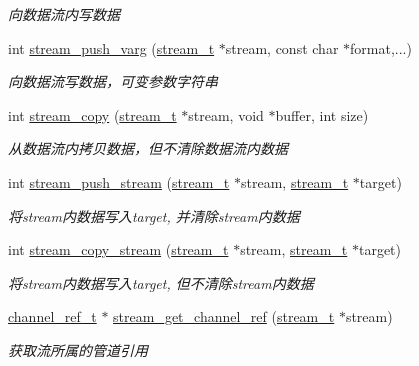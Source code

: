 \begin{DoxyCompactItemize}
\begin{DoxyCompactList}\small\item\em 向数据流内写数据 \end{DoxyCompactList}\item 
int \hyperlink{a00108_ga9631c1d90e0fad04b6ad04ccc5b95808_ga9631c1d90e0fad04b6ad04ccc5b95808}{stream\+\_\+push\+\_\+varg} (\hyperlink{a00051_a261dba04f46f5c59a68a05f69f5a65a8_a261dba04f46f5c59a68a05f69f5a65a8}{stream\+\_\+t} $\ast$stream, const char $\ast$format,...)
\begin{DoxyCompactList}\small\item\em 向数据流写数据，可变参数字符串 \end{DoxyCompactList}\item 
int \hyperlink{a00108_ga380555bf71ee99f6b2bb4f76738d507f_ga380555bf71ee99f6b2bb4f76738d507f}{stream\+\_\+copy} (\hyperlink{a00051_a261dba04f46f5c59a68a05f69f5a65a8_a261dba04f46f5c59a68a05f69f5a65a8}{stream\+\_\+t} $\ast$stream, void $\ast$buffer, int size)
\begin{DoxyCompactList}\small\item\em 从数据流内拷贝数据，但不清除数据流内数据 \end{DoxyCompactList}\item 
int \hyperlink{a00108_gad5336c2b89b6edea5f277d5ebc221e15_gad5336c2b89b6edea5f277d5ebc221e15}{stream\+\_\+push\+\_\+stream} (\hyperlink{a00051_a261dba04f46f5c59a68a05f69f5a65a8_a261dba04f46f5c59a68a05f69f5a65a8}{stream\+\_\+t} $\ast$stream, \hyperlink{a00051_a261dba04f46f5c59a68a05f69f5a65a8_a261dba04f46f5c59a68a05f69f5a65a8}{stream\+\_\+t} $\ast$target)
\begin{DoxyCompactList}\small\item\em 将stream内数据写入target, 并清除stream内数据 \end{DoxyCompactList}\item 
int \hyperlink{a00108_ga296aea89ba5bec6566e119855df3b18c_ga296aea89ba5bec6566e119855df3b18c}{stream\+\_\+copy\+\_\+stream} (\hyperlink{a00051_a261dba04f46f5c59a68a05f69f5a65a8_a261dba04f46f5c59a68a05f69f5a65a8}{stream\+\_\+t} $\ast$stream, \hyperlink{a00051_a261dba04f46f5c59a68a05f69f5a65a8_a261dba04f46f5c59a68a05f69f5a65a8}{stream\+\_\+t} $\ast$target)
\begin{DoxyCompactList}\small\item\em 将stream内数据写入target, 但不清除stream内数据 \end{DoxyCompactList}\item 
\hyperlink{a00051_a151271c9d188ef28d4d24bb81dcc1263_a151271c9d188ef28d4d24bb81dcc1263}{channel\+\_\+ref\+\_\+t} $\ast$ \hyperlink{a00108_gab4b3e49d2c44a601e8bb7f568577fae4_gab4b3e49d2c44a601e8bb7f568577fae4}{stream\+\_\+get\+\_\+channel\+\_\+ref} (\hyperlink{a00051_a261dba04f46f5c59a68a05f69f5a65a8_a261dba04f46f5c59a68a05f69f5a65a8}{stream\+\_\+t} $\ast$stream)
\begin{DoxyCompactList}\small\item\em 获取流所属的管道引用 \end{DoxyCompactList}\end{DoxyCompactItemize}


